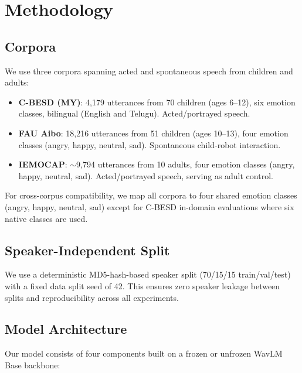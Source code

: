 \section{Methodology}

\subsection{Corpora}

We use three corpora spanning acted and spontaneous speech from children and adults:

\begin{itemize}
    \item \textbf{C-BESD (MY)}: 4,179 utterances from 70 children (ages 6--12), six emotion classes, bilingual (English and Telugu). Acted/portrayed speech.
    \item \textbf{FAU Aibo}: 18,216 utterances from 51 children (ages 10--13), four emotion classes (angry, happy, neutral, sad). Spontaneous child-robot interaction.
    \item \textbf{IEMOCAP}: $\sim$9,794 utterances from 10 adults, four emotion classes (angry, happy, neutral, sad). Acted/portrayed speech, serving as adult control.
\end{itemize}

For cross-corpus compatibility, we map all corpora to four shared emotion classes (angry, happy, neutral, sad) except for C-BESD in-domain evaluations where six native classes are used.

\subsection{Speaker-Independent Split}

We use a deterministic MD5-hash-based speaker split (70/15/15 train/val/test) with a fixed data split seed of 42. This ensures zero speaker leakage between splits and reproducibility across all experiments.

\subsection{Model Architecture}

Our model consists of four components built on a frozen or unfrozen WavLM Base backbone:

